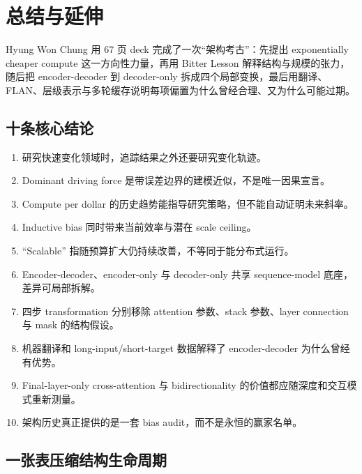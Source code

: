 \section{总结与延伸}

Hyung Won Chung 用 67 页 deck 完成了一次“架构考古”：先提出 exponentially cheaper compute 这一方向性力量，再用 Bitter Lesson 解释结构与规模的张力，随后把 encoder-decoder 到 decoder-only 拆成四个局部变换，最后用翻译、FLAN、层级表示与多轮缓存说明每项偏置为什么曾经合理、又为什么可能过期。

\subsection{十条核心结论}

\begin{enumerate}
  \item 研究快速变化领域时，追踪结果之外还要研究变化轨迹。
  \item Dominant driving force 是带误差边界的建模近似，不是唯一因果宣言。
  \item Compute per dollar 的历史趋势能指导研究策略，但不能自动证明未来斜率。
  \item Inductive bias 同时带来当前效率与潜在 scale ceiling。
  \item ``Scalable'' 指随预算扩大仍持续改善，不等同于能分布式运行。
  \item Encoder-decoder、encoder-only 与 decoder-only 共享 sequence-model 底座，差异可局部拆解。
  \item 四步 transformation 分别移除 attention 参数、stack 参数、layer connection 与 mask 的结构假设。
  \item 机器翻译和 long-input/short-target 数据解释了 encoder-decoder 为什么曾经有优势。
  \item Final-layer-only cross-attention 与 bidirectionality 的价值都应随深度和交互模式重新测量。
  \item 架构历史真正提供的是一套 bias audit，而不是永恒的赢家名单。
\end{enumerate}

\subsection{一张表压缩结构生命周期}

